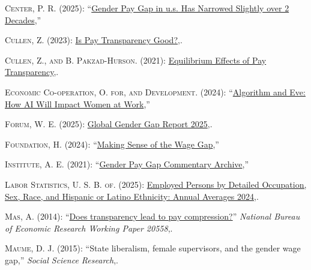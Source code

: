 \documentclass[
  letterpaper,
  DIV=11,
  numbers=noendperiod]{scrartcl}
\newlength{\cslhangindent}
\newenvironment{CSLReferences}[2] %
 {\begin{list}{}{%
  \setlength{\itemindent}{0pt}
  \setlength{\leftmargin}{0pt}
  \setlength{\parsep}{0pt}
  \ifodd #1
   \setlength{\leftmargin}{\cslhangindent}
   \setlength{\itemindent}{-1\cslhangindent}
  \fi
  \setlength{\itemsep}{#2\baselineskip}}}
 {\end{list}}
\begin{document}
\label{refs}
\begin{CSLReferences}{1}{1}
\textsc{Center, P. R.} (2025):
{``\href{https://www.pewresearch.org/short-reads/2025/03/04/gender-pay-gap-in-us-has-narrowed-slightly-over-2-decades/}{Gender
Pay Gap in u.s. Has Narrowed Slightly over 2 Decades},''}

\textsc{Cullen, Z.} (2023):
\href{https://www.nber.org/system/files/working_papers/w31060/w31060.pdf}{Is
Pay Transparency Good?},.

\textsc{Cullen, Z., and B. Pakzad-Hurson}. (2021):
\href{https://www.nber.org/system/files/working_papers/w28903/revisions/w28903.rev0.pdf}{Equilibrium
Effects of Pay Transparency},.

\textsc{Economic Co-operation, O. for, and Development}. (2024):
{``\href{https://www.oecd.org/content/dam/oecd/en/publications/reports/2024/12/algorithm-and-eve_0e889c45/a1603510-en.pdf}{Algorithm
and Eve: How AI Will Impact Women at Work},''}

\textsc{Forum, W. E.} (2025):
\href{https://reports.weforum.org/docs/WEF_GGGR_2025.pdf}{Global Gender
Gap Report 2025},.

\textsc{Foundation, H.} (2024):
{``\href{https://www.heritage.org/jobs-and-labor/commentary/making-sense-the-wage-gap}{Making
Sense of the Wage Gap},''}

\textsc{Institute, A. E.} (2021): {``\href{https://www.aei.org/}{Gender
Pay Gap Commentary Archive},''}

\textsc{Labor Statistics, U. S. B. of}. (2025):
\href{https://www.bls.gov/cps/cpsaat11.htm}{Employed Persons by Detailed
Occupation, Sex, Race, and Hispanic or Latino Ethnicity: Annual Averages
2024},.

\textsc{Mas, A.} (2014):
{``\href{https://www.nber.org/system/files/working_papers/w20558/w20558.pdf}{Does
transparency lead to pay compression?}''} \emph{National Bureau of
Economic Research Working Paper 20558},.

\textsc{Maume, D. J.} (2015): {``State liberalism, female supervisors,
and the gender wage gap,''} \emph{Social Science Research},.


\end{CSLReferences}
\end{document}
